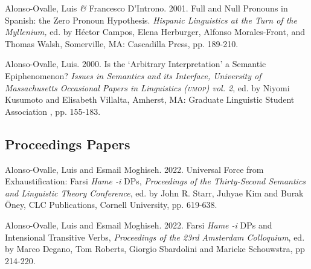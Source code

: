 \documentclass[11pt]{article}
\begin{document}
Alonso-Ovalle, Luis \textit{\&} Francesco D'Introno. 2001. Full and Null Pronouns in Spanish: the Zero Pronoun Hypothesis. \textit{Hispanic Linguistics at the Turn of the Myllenium,} ed. by H\'ector Campos, Elena Herburger, Alfonso Morales-Front, and Thomas Walsh, Somerville, MA: Cascadilla Press, pp. 189-210.

Alonso-Ovalle, Luis. 2000. Is the `Arbitrary Interpretation' a Semantic Epiphenomenon? {\it Issues in Semantics and its Interface, University of Massachusetts Occasional Papers in Linguistics (\textsc{umop}) vol. 2}, ed. by  Niyomi Kusumoto and Elisabeth Villalta, Amherst, MA: Graduate Linguistic Student Association , pp. 155-183. 



\subsection*{Proceedings Papers}

Alonso-Ovalle, Luis and Esmail Moghiseh. 2022. Universal Force from Exhaustification: Farsi \textit{Hame -i} DPs, \textit{Proceedings of the Thirty-Second Semantics and Linguistic Theory Conference}, ed. by John R. Starr, Juhyae Kim and Burak \"{O}ney, CLC Publications, Cornell University, pp. 619-638. %


Alonso-Ovalle, Luis and Esmail Moghiseh. 2022. Farsi \textit{Hame -i} DPs and Intensional Transitive Verbs, \textit{Proceedings of the 23rd Amsterdam Colloquium}, ed. by Marco Degano, Tom Roberts, Giorgio Sbardolini and Marieke Schouwstra, pp 214-220.%
\end{document}
